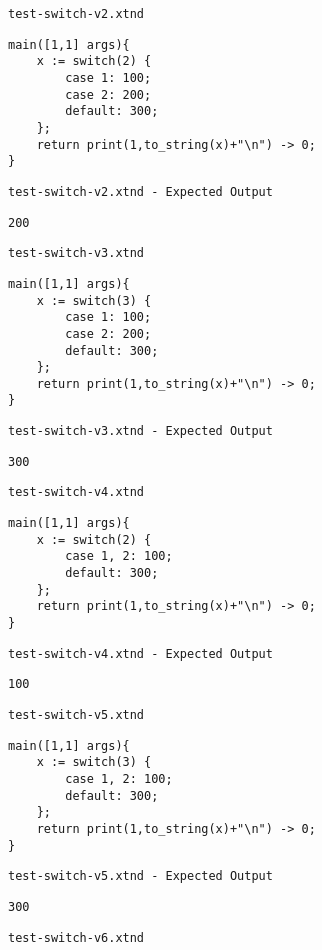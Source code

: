 \medskip \noindent \texttt{test-switch-v2.xtnd}


\begin{lstlisting}
main([1,1] args){
	x := switch(2) {
		case 1: 100;
		case 2: 200;
		default: 300;
	};
	return print(1,to_string(x)+"\n") -> 0;
}
\end{lstlisting}


\medskip \noindent \texttt{test-switch-v2.xtnd - Expected Output}


\begin{lstlisting}
200
\end{lstlisting}


\medskip \noindent \texttt{test-switch-v3.xtnd}


\begin{lstlisting}
main([1,1] args){
	x := switch(3) {
		case 1: 100;
		case 2: 200;
		default: 300;
	};
	return print(1,to_string(x)+"\n") -> 0;
}
\end{lstlisting}


\medskip \noindent \texttt{test-switch-v3.xtnd - Expected Output}


\begin{lstlisting}
300
\end{lstlisting}


\medskip \noindent \texttt{test-switch-v4.xtnd}


\begin{lstlisting}
main([1,1] args){
	x := switch(2) {
		case 1, 2: 100;
		default: 300;
	};
	return print(1,to_string(x)+"\n") -> 0;
}
\end{lstlisting}


\medskip \noindent \texttt{test-switch-v4.xtnd - Expected Output}


\begin{lstlisting}
100
\end{lstlisting}


\medskip \noindent \texttt{test-switch-v5.xtnd}


\begin{lstlisting}
main([1,1] args){
	x := switch(3) {
		case 1, 2: 100;
		default: 300;
	};
	return print(1,to_string(x)+"\n") -> 0;
}
\end{lstlisting}


\medskip \noindent \texttt{test-switch-v5.xtnd - Expected Output}


\begin{lstlisting}
300
\end{lstlisting}


\medskip \noindent \texttt{test-switch-v6.xtnd}


